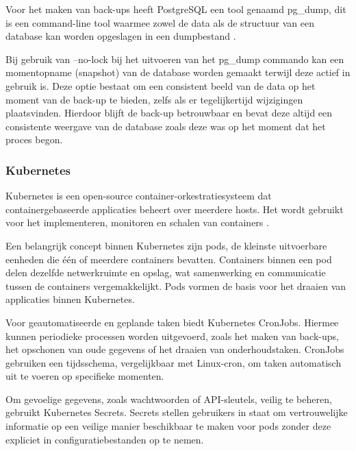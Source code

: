Voor het maken van back-ups heeft PostgreSQL een tool genaamd pg\_dump, dit is een command-line tool waarmee zowel de data als de structuur van een database kan worden opgeslagen in een dumpbestand \autocite{Drake2002}.

Bij gebruik van --no-lock bij het uitvoeren van het pg\_dump commando kan een momentopname (snapshot) van de database worden gemaakt terwijl deze actief in gebruik is.
Deze optie bestaat om een consistent beeld van de data op het moment van de back-up te bieden, zelfs als er tegelijkertijd wijzigingen plaatsvinden. Hierdoor blijft de back-up betrouwbaar en bevat deze altijd een consistente weergave van de database zoals deze was op het moment dat het proces begon.

\subsubsection{Kubernetes}
Kubernetes is een open-source container-orkestratiesysteem dat containergebaseerde applicaties beheert over meerdere hosts. Het wordt gebruikt voor het implementeren, monitoren en schalen van containers \autocite{Gupta2019}.

Een belangrijk concept binnen Kubernetes zijn pods, de kleinste uitvoerbare eenheden die één of meerdere containers bevatten. Containers binnen een pod delen dezelfde netwerkruimte en opslag, wat samenwerking en communicatie tussen de containers vergemakkelijkt. Pods vormen de basis voor het draaien van applicaties binnen Kubernetes.

Voor geautomatiseerde en geplande taken biedt Kubernetes CronJobs. Hiermee kunnen periodieke processen worden uitgevoerd, zoals het maken van back-ups, het opschonen van oude gegevens of het draaien van onderhoudstaken. CronJobs gebruiken een tijdsschema, vergelijkbaar met Linux-cron, om taken automatisch uit te voeren op specifieke momenten.

Om gevoelige gegevens, zoals wachtwoorden of API-sleutels, veilig te beheren, gebruikt Kubernetes Secrets. Secrets stellen gebruikers in staat om vertrouwelijke informatie op een veilige manier beschikbaar te maken voor pods zonder deze expliciet in configuratiebestanden op te nemen.



